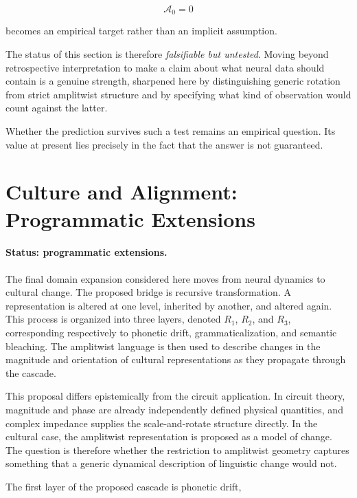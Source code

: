 \documentclass[11pt]{article}
\begin{document}
\begin{equation}
\mathcal A_0=0
\end{equation}

becomes an empirical target rather than an implicit assumption.

The status of this section is therefore \emph{falsifiable but untested}. Moving beyond retrospective interpretation to make a claim about what neural data should contain is a genuine strength, sharpened here by distinguishing generic rotation from strict amplitwist structure and by specifying what kind of observation would count against the latter.

Whether the prediction survives such a test remains an empirical question. Its value at present lies precisely in the fact that the answer is not guaranteed.

\section{Culture and Alignment: Programmatic Extensions}

\paragraph{Status: programmatic extensions.}

The final domain expansion considered here \citep{FlyxionCascades} moves from neural dynamics to cultural change. The proposed bridge is recursive transformation. A representation is altered at one level, inherited by another, and altered again. This process is organized into three layers, denoted $R_1$, $R_2$, and $R_3$, corresponding respectively to phonetic drift, grammaticalization, and semantic bleaching. The amplitwist language is then used to describe changes in the magnitude and orientation of cultural representations as they propagate through the cascade.

This proposal differs epistemically from the circuit application. In circuit theory, magnitude and phase are already independently defined physical quantities, and complex impedance supplies the scale-and-rotate structure directly. In the cultural case, the amplitwist representation is proposed as a model of change. The question is therefore whether the restriction to amplitwist geometry captures something that a generic dynamical description of linguistic change would not.

The first layer of the proposed cascade is phonetic drift,
\end{document}
